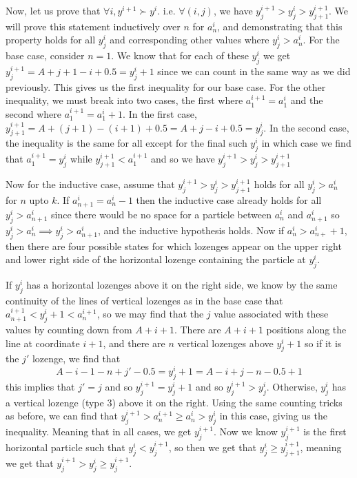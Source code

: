 \documentclass[12pt]{article}
\begin{document}
		Now, let us prove that $\forall i, y^{i+1}\succ y^i$. i.e. $\forall (i,j)$, we have $y_j^{i+1}>y_j^{i}>y_{j+1}^{i+1}$.
		We will prove this statement inductively over $n$ for $a_{n}^i$, and demonstrating that this property holds for all $y_j^i$ and corresponding other values where $y_j^i>a_n^i$. 
		For the base case, consider $n=1$. We know that for each of these $y_j^i$ we get $y_j^{i+1}=A+j+1-i+0.5=y_j^i+1$ since we can count in the same way as we did previously. 
		This gives us the first inequality for our base case. For the other inequality, we must break into two cases, the first where $a_1^{i+1}=a_1^i$ and the second where $a_1^{i+1}=a_1^i+1$. 
		In the first case, $y_{j+1}^{i+1}=A+(j+1)-(i+1)+0.5=A+j-i+0.5=y_j^i$. 
		In the second case, the inequality is the same for all except for the final such $y_j^i$ in which case we find that $a_1^{i+1}=y_j^i$ while $y_{j+1}^{i+1}<a_1^{i+1}$ and so we have $y_j^{i+1}>y_j^i>y_{j+1}^{i+1}$
		
		Now for the inductive case, assume that $y_j^{i+1}>y_j^{i}>y_{j+1}^{i+1}$ holds for all $y_j^i>a_n^i$ for $n$ upto $k$. 
		If $a_{n+1}^{i}=a_n^i-1$ then the inductive case already holds for all $y_j^i>a_{n+1}^i$ since there would be no space for a particle between $a_n^i$ and $a_{n+1}^i$ so $y_j^i>a_n^i\implies y_j^i>a_{n+1}^i$, and the inductive hypothesis holds. 
		Now if $a_n^i>a_{n+}^i+1$, then there are four possible states for which lozenges appear on the upper right and lower right side of the horizontal lozenge containing the particle at $y_j^i$. 
		
		If $y_j^i$ has a horizontal lozenges above it on the right side, we know by the same continuity of the lines of vertical lozenges as in the base case that $a_{n+1}^{i+1}< y_{j}^{i}+1<a_n^{i+1}$, so we may find that the $j$ value associated with these values by counting down from $A+i+1$. 
		There are $A+i+1$ positions along the line at coordinate $i+1$, and there are $n$ vertical lozenges above $y_j^i+1$ so if it is the $j'$ lozenge, we find that $$A-i-1-n+j'-0.5=y_j^i+1=A-i+j-n-0.5+1$$  
		this implies that $j'= j$ and so $y^{i+1}_{j}=y^{i}_j+1$ and so $y_{j}^{i+1}>y^i_j$. 
		Otherwise, $y_j^i$ has a vertical lozenge (type 3) above it on the right.
		Using the same counting tricks as before, we can find that $y_{j}^{i+1}>a_{n}^{i+1}\geq a_n^i>y_j^i$ in this case, giving us the inequality. Meaning that in all cases, we get $y_{j}^{i+1}$.  
		Now we  know $y_{j}^{i+1}$ is the first horizontal particle such that $y_j^i<y_j^{i+1}$, so then we get that $y_j^i\geq y_{j+1}^{i+1}$, meaning we get that $y_j^{i+1}>y_j^i\geq y_j^{i+1}$. 
		
\end{document}
